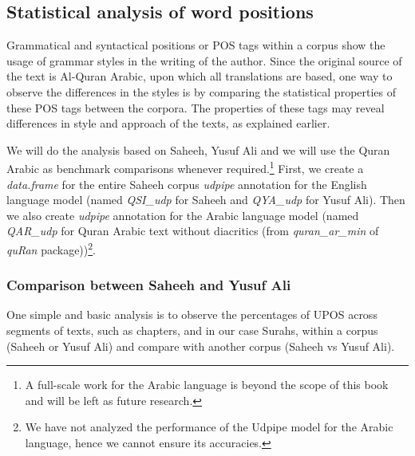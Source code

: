 \documentclass[
]{article}
\begin{document}
\footnotesize

\normalsize

\hypertarget{statistical-analysis-of-word-positions}{%
\subsection{Statistical analysis of word positions}\label{statistical-analysis-of-word-positions}}

Grammatical and syntactical positions or POS tags within a corpus show the usage of grammar styles in the writing of the author. Since the original source of the text is Al-Quran Arabic, upon which all translations are based, one way to observe the differences in the styles is by comparing the statistical properties of these POS tags between the corpora. The properties of these tags may reveal differences in style and approach of the texts, as explained earlier.

We will do the analysis based on Saheeh, Yusuf Ali and we will use the Quran Arabic as benchmark comparisons whenever required.\footnote{A full-scale work for the Arabic language is beyond the scope of this book and will be left as future research.} First, we create a \emph{data.frame} for the entire Saheeh corpus \emph{udpipe} annotation for the English language model (named \emph{QSI\_udp} for Saheeh and \emph{QYA\_udp} for Yusuf Ali). Then we also create \emph{udpipe} annotation for the Arabic language model (named \emph{QAR\_udp} for Quran Arabic text without diacritics (from \emph{quran\_ar\_min} of \emph{quRan} package))\footnote{We have not analyzed the performance of the Udpipe model for the Arabic language, hence we cannot ensure its accuracies.}.

\hypertarget{comparison-between-saheeh-and-yusuf-ali}{%
\subsubsection{Comparison between Saheeh and Yusuf Ali}\label{comparison-between-saheeh-and-yusuf-ali}}

One simple and basic analysis is to observe the percentages of UPOS across segments of texts, such as chapters, and in our case Surahs, within a corpus (Saheeh or Yusuf Ali) and compare with another corpus (Saheeh vs Yusuf Ali).

\footnotesize
\end{document}
